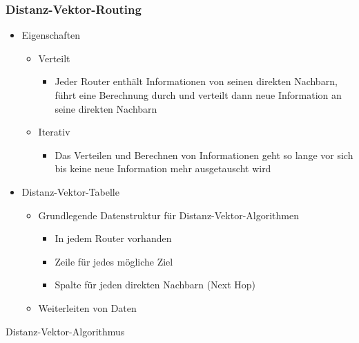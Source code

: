     \subsubsection{Distanz-Vektor-Routing}
      \begin{itemize}
        \item Eigenschaften
          \begin{itemize}
            \item Verteilt
              \begin{itemize}
                \item Jeder Router enthält Informationen von seinen direkten Nachbarn, führt eine
                  Berechnung durch und verteilt dann neue Information an seine direkten Nachbarn
              \end{itemize}
            \item Iterativ
              \begin{itemize}
                \item Das Verteilen und Berechnen von Informationen geht so lange vor sich bis keine
                  neue Information mehr ausgetauscht wird
              \end{itemize}
          \end{itemize}
        \item Distanz-Vektor-Tabelle
          \begin{itemize}
            \item Grundlegende Datenstruktur für Distanz-Vektor-Algorithmen
              \begin{itemize}
              \item In jedem Router vorhanden
              \item Zeile für jedes mögliche Ziel
              \item Spalte für jeden direkten Nachbarn (Next Hop)
              \end{itemize}
            \item Weiterleiten von Daten
          \end{itemize}
      \end{itemize}
      Distanz-Vektor-Algorithmus
